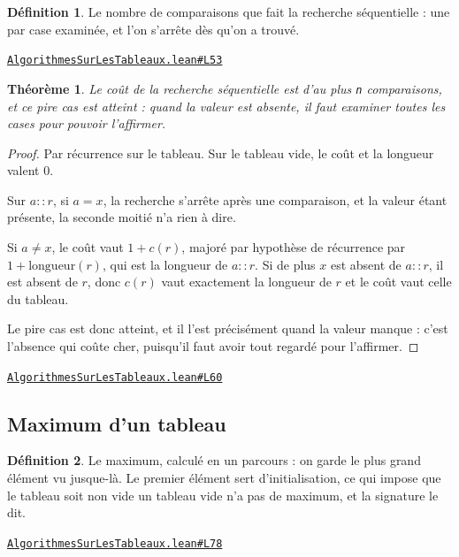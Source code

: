 \documentclass[11pt,a4paper]{article}
\theoremstyle{definition}
\newtheorem{definition}{Définition}
\theoremstyle{plain}
\newtheorem{theoreme}{Théorème}
\newcommand{\source}[2]{\par\smallskip\noindent\hfill{\footnotesize\href{#1}{\texttt{#2}}}\par\smallskip}
\begin{document}
\begin{definition}
Le nombre de comparaisons que fait la recherche séquentielle : une par case
examinée, et l'on s'arrête dès qu'on a trouvé.
\end{definition}
\source{https://github.com/Commutator-IO/learn-lean/blob/main/courses/02-lycee/11-informatique-nsi/AlgorithmesSurLesTableaux.lean\#L53}{AlgorithmesSurLesTableaux.lean\#L53}

\begin{theoreme}
Le coût de la recherche séquentielle est d'au plus \texttt{n} comparaisons, et ce pire
cas est atteint : quand la valeur est absente, il faut examiner toutes les cases pour
pouvoir l'affirmer.
\end{theoreme}
\begin{proof}
Par récurrence sur le tableau. Sur le tableau vide, le coût et la longueur valent
\(0\).

Sur \(a :: r\), si \(a = x\), la recherche s'arrête après une comparaison, et la valeur
étant présente, la seconde moitié n'a rien à dire.

Si \(a \ne x\), le coût vaut \(1 + c(r)\), majoré par hypothèse de récurrence par
\(1 + \mathrm{longueur}(r)\), qui est la longueur de \(a :: r\). Si de plus \(x\) est
absent de \(a :: r\), il est absent de \(r\), donc \(c(r)\) vaut exactement la longueur
de \(r\) et le coût vaut celle du tableau.

Le pire cas est donc atteint, et il l'est précisément quand la valeur manque : c'est
l'absence qui coûte cher, puisqu'il faut avoir tout regardé pour l'affirmer.
\end{proof}
\source{https://github.com/Commutator-IO/learn-lean/blob/main/courses/02-lycee/11-informatique-nsi/AlgorithmesSurLesTableaux.lean\#L60}{AlgorithmesSurLesTableaux.lean\#L60}

\subsection{Maximum d'un tableau}

\begin{definition}
Le maximum, calculé en un parcours : on garde le plus grand élément vu jusque-là.
Le premier élément sert d'initialisation, ce qui impose que le tableau soit non vide
\textemdash{} un tableau vide n'a pas de maximum, et la signature le dit.
\end{definition}
\source{https://github.com/Commutator-IO/learn-lean/blob/main/courses/02-lycee/11-informatique-nsi/AlgorithmesSurLesTableaux.lean\#L78}{AlgorithmesSurLesTableaux.lean\#L78}
\end{document}
